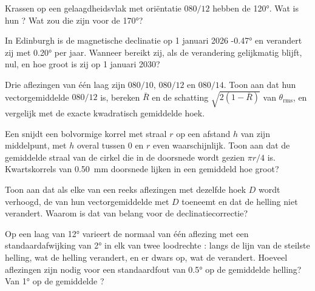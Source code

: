 \begin{exercise}[$\star\star$]\label{exo:b1:field-lab-methods-1:7}
Krassen op een gelaagdheidsvlak met oriëntatie $080/12$ hebben de  \ang{120}. Wat is hun ? Wat zou die
zijn voor de  \ang{170}?
\end{exercise}

\begin{exercise}[$\star\star$]\label{exo:b1:field-lab-methods-1:8}
In Edinburgh is de magnetische declinatie op 1 januari 2026 \ang{-0.47} en verandert zij met \ang{+0.20} per jaar.
Wanneer bereikt zij, als de verandering gelijkmatig blijft, nul, en hoe groot is zij op 1 januari 2030?
\end{exercise}

\begin{exercise}[$\star\star$]\label{exo:b1:field-lab-methods-1:9}
Drie aflezingen van één laag zijn $080/10$, $080/12$ en $080/14$. Toon aan dat hun vectorgemiddelde $080/12$ is,
bereken $\bar R$ en de schatting $\sqrt{2(1 - \bar R)}$ van $\theta_{\text{rms}}$, en vergelijk met de exacte
kwadratisch gemiddelde hoek.
\end{exercise}

\begin{exercise}[$\star\star\star$]\label{exo:b1:field-lab-methods-1:10}
Een  snijdt een bolvormige korrel met straal $r$ op een afstand $h$ van zijn middelpunt, met $h$
overal tussen 0 en $r$ even waarschijnlijk. Toon aan dat de gemiddelde straal van de cirkel die in de doorsnede
wordt gezien $\pi r/4$ is. Kwartskorrels van \qty{0.50}{mm} doorsnede lijken in een  gemiddeld hoe groot?
\end{exercise}

\begin{exercise}[$\star\star\star$]\label{exo:b1:field-lab-methods-1:11}
Toon aan dat als elke  van een reeks aflezingen met dezelfde hoek $D$ wordt verhoogd, de
 van hun vectorgemiddelde met $D$ toeneemt en dat de helling niet verandert. Waarom is dat van
belang voor de declinatiecorrectie?
\end{exercise}

\begin{exercise}[$\star\star\star$]\label{exo:b1:field-lab-methods-1:12}
Op een laag van \ang{12} varieert de normaal van één aflezing met een standaardafwijking van \ang{2} in elk van twee
loodrechte : langs de lijn van de steilste helling, wat de helling verandert, en er dwars op, wat de
 verandert. Hoeveel aflezingen zijn nodig voor een standaardfout van \ang{0.5} op de gemiddelde helling?
Van \ang{1} op de gemiddelde ?
\end{exercise}


